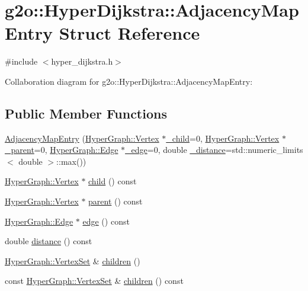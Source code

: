 \hypertarget{structg2o_1_1HyperDijkstra_1_1AdjacencyMapEntry}{}\section{g2o\+:\+:Hyper\+Dijkstra\+:\+:Adjacency\+Map\+Entry Struct Reference}
\label{structg2o_1_1HyperDijkstra_1_1AdjacencyMapEntry}


{\ttfamily \#include $<$hyper\+\_\+dijkstra.\+h$>$}



Collaboration diagram for g2o\+:\+:Hyper\+Dijkstra\+:\+:Adjacency\+Map\+Entry\+:
\subsection*{Public Member Functions}
\begin{DoxyCompactItemize}
\item 
\hyperlink{structg2o_1_1HyperDijkstra_1_1AdjacencyMapEntry_a160f87d80b7c2137abcce561fbc5feed}{Adjacency\+Map\+Entry} (\hyperlink{classg2o_1_1HyperGraph_1_1Vertex}{Hyper\+Graph\+::\+Vertex} $\ast$\hyperlink{structg2o_1_1HyperDijkstra_1_1AdjacencyMapEntry_a7ccdf917414efa537c3942d360ca127a}{\+\_\+child}=0, \hyperlink{classg2o_1_1HyperGraph_1_1Vertex}{Hyper\+Graph\+::\+Vertex} $\ast$\hyperlink{structg2o_1_1HyperDijkstra_1_1AdjacencyMapEntry_a3490ab9668c98d3e0cb14c54b9d41747}{\+\_\+parent}=0, \hyperlink{classg2o_1_1HyperGraph_1_1Edge}{Hyper\+Graph\+::\+Edge} $\ast$\hyperlink{structg2o_1_1HyperDijkstra_1_1AdjacencyMapEntry_adc56c13a328aac02456474a9e7c72415}{\+\_\+edge}=0, double \hyperlink{structg2o_1_1HyperDijkstra_1_1AdjacencyMapEntry_a95b3db28f32badcdce2edf1bae83b78d}{\+\_\+distance}=std\+::numeric\+\_\+limits$<$ double $>$\+::max())
\item 
\hyperlink{classg2o_1_1HyperGraph_1_1Vertex}{Hyper\+Graph\+::\+Vertex} $\ast$ \hyperlink{structg2o_1_1HyperDijkstra_1_1AdjacencyMapEntry_a16b56779c464b948cb0a102929e1c5f2}{child} () const 
\item 
\hyperlink{classg2o_1_1HyperGraph_1_1Vertex}{Hyper\+Graph\+::\+Vertex} $\ast$ \hyperlink{structg2o_1_1HyperDijkstra_1_1AdjacencyMapEntry_a2955ede218d2843f1ceae9402e3a9c23}{parent} () const 
\item 
\hyperlink{classg2o_1_1HyperGraph_1_1Edge}{Hyper\+Graph\+::\+Edge} $\ast$ \hyperlink{structg2o_1_1HyperDijkstra_1_1AdjacencyMapEntry_a4cbdf1ab4ad29ab534cad318ca6898dc}{edge} () const 
\item 
double \hyperlink{structg2o_1_1HyperDijkstra_1_1AdjacencyMapEntry_a40a498bd2fae5c3a4a25d91599e22f9f}{distance} () const 
\item 
\hyperlink{classg2o_1_1HyperGraph_a703938cdb4bb636860eed55a2489d70c}{Hyper\+Graph\+::\+Vertex\+Set} \& \hyperlink{structg2o_1_1HyperDijkstra_1_1AdjacencyMapEntry_aa1a11048612968381db6a0ad525f7e0d}{children} ()
\item 
const \hyperlink{classg2o_1_1HyperGraph_a703938cdb4bb636860eed55a2489d70c}{Hyper\+Graph\+::\+Vertex\+Set} \& \hyperlink{structg2o_1_1HyperDijkstra_1_1AdjacencyMapEntry_a631ac78faf06416839df66a8c93aab9e}{children} () const 
\end{DoxyCompactItemize}
